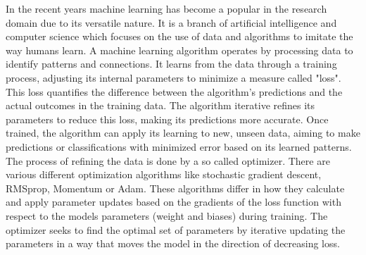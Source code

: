 \documentclass[
a4paper, 
12pt,
grayscalebody, %
abstract=on,
twoside, BCOR10mm, 12pt, DIV13,headinclude, footexclude, final, abstracton, openright
]{ibireprt}
\numberwithin{equation}{chapter}
\numberwithin{table}{chapter}
\numberwithin{figure}{chapter}
\numberwithin{algorithm}{chapter}
\numberwithin{example}{chapter}
\numberwithin{example}{chapter}
\begin{document}
In the recent years machine learning has become a popular in the research domain due to its versatile nature. It is a branch of artificial intelligence and computer science which focuses on the use of data and algorithms to imitate the way humans learn. A machine learning algorithm operates by processing data to identify patterns and connections. It learns from the data through a training process, adjusting its internal parameters to minimize a measure called "loss". This loss quantifies the difference between the algorithm's predictions and the actual outcomes in the training data. The algorithm iterative refines its parameters to reduce this loss, making its predictions more accurate. Once trained, the algorithm can apply its learning to new, unseen data, aiming to make predictions or classifications with minimized error based on its learned patterns.
The process of refining the data is done by a so called optimizer. There are various different optimization algorithms like stochastic gradient descent, RMSprop, Momentum or Adam. These algorithms differ in how they calculate and apply parameter updates based on the gradients of the loss function with respect to the models parameters (weight and biases) during training. The optimizer  seeks to find the optimal set of parameters by iterative updating the parameters in a way that moves the model in the direction of decreasing loss.
\end{document}

